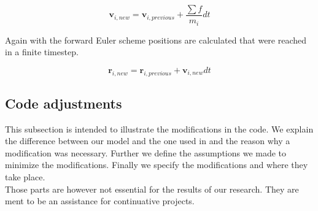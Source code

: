 \documentclass[11pt]{article}
\begin{document}
\begin{equation}
\mathbf{v}_{i,new} = \mathbf{v}_{i,previous} + \frac{\sum {f}}{m_{i}}dt
\end{equation}

Again with the forward Euler scheme positions are calculated that were reached in a finite timestep.

\begin{equation}
\mathbf{r}_{i,new}=\mathbf{r}_{i,previous}+\mathbf{v}_{i,new}dt
\end{equation}

\subsection{Code adjustments}

This subsection is intended to illustrate the modifications in the code. We explain the difference between our model and the one used in \cite{Building} and the reason why a modification was necessary. Further we define the assumptions we made to minimize the modifications. Finally we specify the modifications and where they take place. 
\\
Those parts are however not essential for the results of our research. They are ment to be an assistance for continuative projects.
\end{document}
